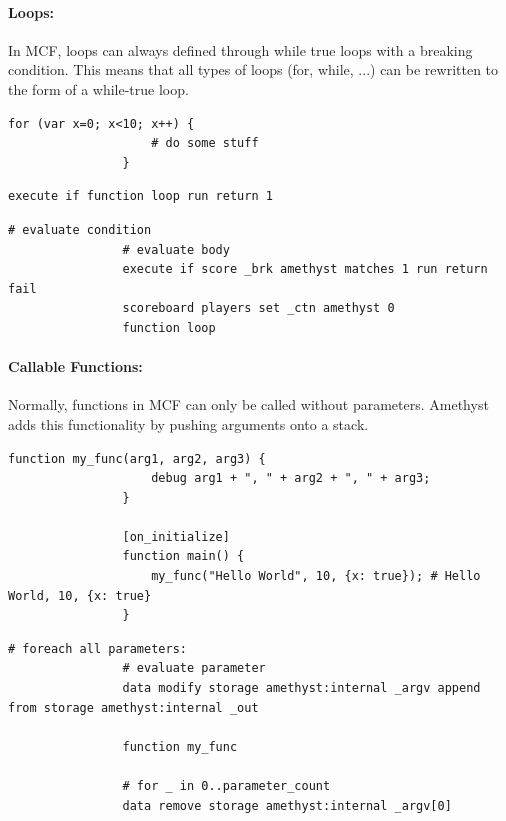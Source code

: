 \documentclass[12pt]{article}
\begin{document}
        \paragraph{Loops:}
            In MCF, loops can always defined through while true loops with a breaking condition. This means that all types of loops (for, while, ...) can be rewritten to the form of a while-true loop.
            
            \begin{lstlisting}[language=Amethyst,title=Language Reference]
                for (var x=0; x<10; x++) {
                    # do some stuff
                }
            \end{lstlisting}
            
            \begin{lstlisting}[language=Mcfunction,title=calling.mcfunction]
                execute if function loop run return 1
            \end{lstlisting}
              
            \begin{lstlisting}[language=Mcfunction,title=loop.mcfunction]
                # evaluate condition
                # evaluate body
                execute if score _brk amethyst matches 1 run return fail
                scoreboard players set _ctn amethyst 0
                function loop
            \end{lstlisting}
            
        \paragraph{Callable Functions:}
            Normally, functions in MCF can only be called without parameters. Amethyst adds this functionality by pushing arguments onto a stack.
            
            \begin{lstlisting}[language=Amethyst,title=Language Reference]
                function my_func(arg1, arg2, arg3) {
                    debug arg1 + ", " + arg2 + ", " + arg3;
                }
               
                [on_initialize] 
                function main() {
                    my_func("Hello World", 10, {x: true}); # Hello World, 10, {x: true}
                }
            \end{lstlisting}
        
            \begin{lstlisting}[language=Mcfunction,title=calling.mcfunction]
                # foreach all parameters:
                # evaluate parameter
                data modify storage amethyst:internal _argv append from storage amethyst:internal _out
                
                function my_func
                
                # for _ in 0..parameter_count
                data remove storage amethyst:internal _argv[0]
            \end{lstlisting}
            
\end{document}
